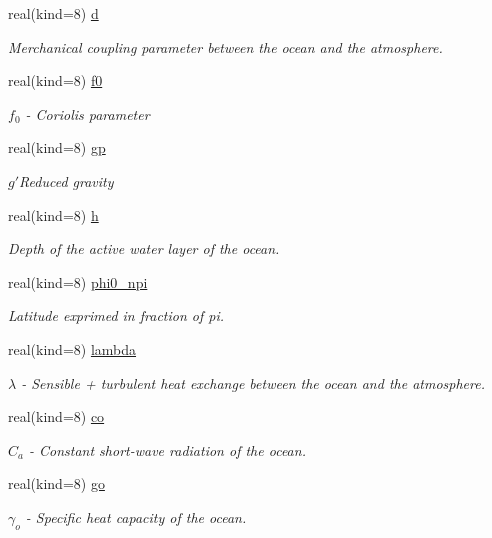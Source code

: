 \begin{DoxyCompactItemize}
real(kind=8) \hyperlink{namespaceparams_a612e8c87d1d9514ebe7ab3ac95141be3}{d}
\begin{DoxyCompactList}\small\item\em Merchanical coupling parameter between the ocean and the atmosphere. \end{DoxyCompactList}\item 
real(kind=8) \hyperlink{namespaceparams_a83c176b3a593aa6ac77c50d2b5b21032}{f0}
\begin{DoxyCompactList}\small\item\em $f_0$ -\/ Coriolis parameter \end{DoxyCompactList}\item 
real(kind=8) \hyperlink{namespaceparams_a29ba9893360b5685ca584deead6dbc55}{gp}
\begin{DoxyCompactList}\small\item\em $g'$Reduced gravity \end{DoxyCompactList}\item 
real(kind=8) \hyperlink{namespaceparams_a6d9c99d7dfc62518cf51eb98e7f39707}{h}
\begin{DoxyCompactList}\small\item\em Depth of the active water layer of the ocean. \end{DoxyCompactList}\item 
real(kind=8) \hyperlink{namespaceparams_a516e6c305e938087cfe780629c76ef64}{phi0\+\_\+npi}
\begin{DoxyCompactList}\small\item\em Latitude exprimed in fraction of pi. \end{DoxyCompactList}\item 
real(kind=8) \hyperlink{namespaceparams_a022da5c60234624dcc3d76382a7382da}{lambda}
\begin{DoxyCompactList}\small\item\em $\lambda$ -\/ Sensible + turbulent heat exchange between the ocean and the atmosphere. \end{DoxyCompactList}\item 
real(kind=8) \hyperlink{namespaceparams_a36a35eafddb662c94c227a30cbf85fd4}{co}
\begin{DoxyCompactList}\small\item\em $C_a$ -\/ Constant short-\/wave radiation of the ocean. \end{DoxyCompactList}\item 
real(kind=8) \hyperlink{namespaceparams_a30bd914fd64880f5407ebb055e72b88c}{go}
\begin{DoxyCompactList}\small\item\em $\gamma_o$ -\/ Specific heat capacity of the ocean. \end{DoxyCompactList}\item 

\end{DoxyCompactItemize}
